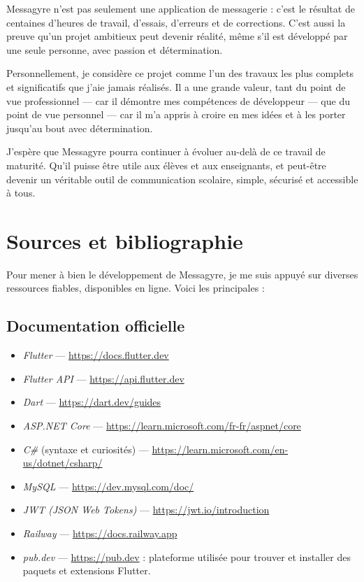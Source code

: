 \documentclass[12pt]{report}
\begin{document}
Messagyre n’est pas seulement une application de messagerie : c’est le résultat de centaines d’heures de travail, d’essais, d’erreurs et de corrections. C’est aussi la preuve qu’un projet ambitieux peut devenir réalité, même s’il est développé par une seule personne, avec passion et détermination.

Personnellement, je considère ce projet comme l’un des travaux les plus complets et significatifs que j’aie jamais réalisés. Il a une grande valeur, tant du point de vue professionnel — car il démontre mes compétences de développeur — que du point de vue personnel — car il m’a appris à croire en mes idées et à les porter jusqu’au bout avec détermination.

J’espère que Messagyre pourra continuer à évoluer au-delà de ce travail de maturité. Qu’il puisse être utile aux élèves et aux enseignants, et peut-être devenir un véritable outil de communication scolaire, simple, sécurisé et accessible à tous.


\chapter{Sources et bibliographie}

Pour mener à bien le développement de Messagyre, je me suis appuyé sur diverses ressources fiables, disponibles en ligne. Voici les principales :

\section{Documentation officielle}

\begin{itemize}
	\item \textit{Flutter} — \url{https://docs.flutter.dev}
	\item \textit{Flutter API} — \url{https://api.flutter.dev}
	\item \textit{Dart} — \url{https://dart.dev/guides}
	\item \textit{ASP.NET Core} — \url{https://learn.microsoft.com/fr-fr/aspnet/core}
	\item \textit{C\#} (syntaxe et curiosités) — \url{https://learn.microsoft.com/en-us/dotnet/csharp/}
	\item \textit{MySQL} — \url{https://dev.mysql.com/doc/}
	\item \textit{JWT (JSON Web Tokens)} — \url{https://jwt.io/introduction}
	\item \textit{Railway} — \url{https://docs.railway.app}
	\item \textit{pub.dev} — \url{https://pub.dev} : plateforme utilisée pour trouver et installer des paquets et extensions Flutter.
\end{itemize}
\end{document}
